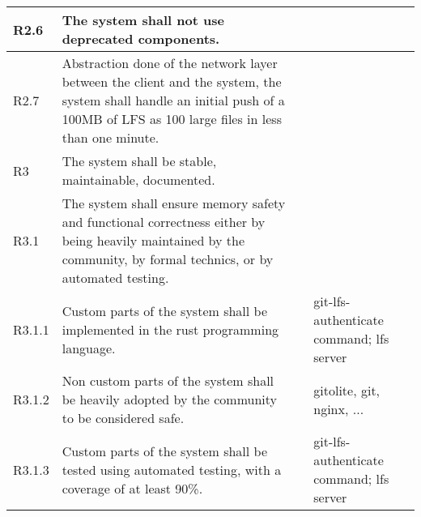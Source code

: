 \documentclass[a4paper,11pt]{article}
\begin{document}
\begin{landscape}
\begin{longtable}{|p{1cm}|p{19cm}|p{2cm}|p{3cm}|}
        \rowcolor[HTML]{DDFFDD}        R2.6       & The system shall not use deprecated components.                                                                                                                                                                                                                                       &                       &                                          \\ \hline
        \rowcolor[HTML]{DDFFDD}        R2.7       & Abstraction done of the network layer between the client and the system, the system shall handle an initial push of a 100MB of LFS as 100 large files in less than one minute.                                                                                                        &                       &                                          \\ \hline
        \rowcolor[HTML]{C0C0C0}        R3         & The system shall be stable, maintainable, documented.                                                                                                                             &                       &                                          \\ \hline
        \rowcolor[HTML]{DDFFDD}        R3.1       & The system shall ensure memory safety and functional correctness either by being heavily maintained by the community, by formal technics, or by automated testing.                                                                                                                    &                       &                                          \\ \hline
        \rowcolor[HTML]{EEFFEE}        R3.1.1     & Custom parts of the system shall be implemented in the rust programming language.                                                                                                                                                                                                     &                       & git-lfs-authenticate command; lfs server \\\hline
        \rowcolor[HTML]{EEFFEE}        R3.1.2     & Non custom parts of the system shall be heavily adopted by the community to be considered safe.                                                                                                                                                                                       &                       & gitolite, git, nginx, ...                \\\hline
        \rowcolor[HTML]{EEFFEE}        R3.1.3     & Custom parts of the system shall be tested using automated testing, with a coverage of at least 90\%.                                                                                                                                                                                 &                       & git-lfs-authenticate command; lfs server \\\hline

\end{longtable}
\end{landscape}
\end{document}
